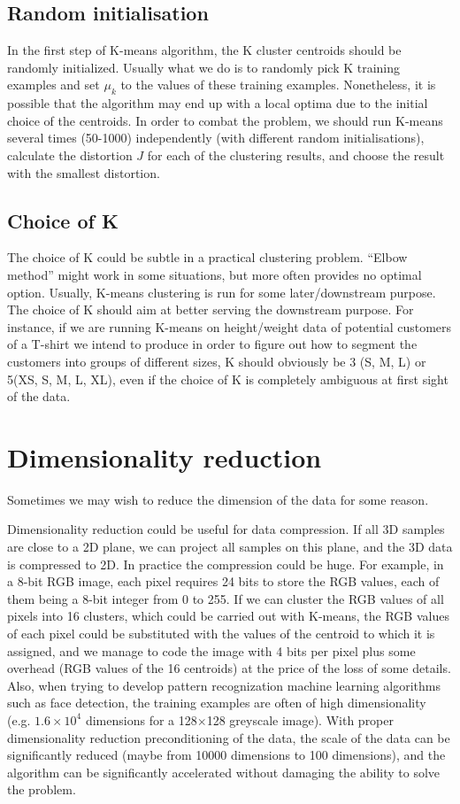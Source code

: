 \subsection{Random initialisation}
In the first step of K-means algorithm, the K cluster centroids should be randomly initialized. Usually what we do is to randomly pick K training examples and set $\mu_k$ to the values of these training examples. Nonetheless, it is possible that the algorithm may end up with a local optima due to the initial choice of the centroids. In order to combat the problem, we should run K-means several times (50-1000) independently (with different random initialisations), calculate the distortion $J$ for each of the clustering results, and choose the result with the smallest distortion.
\subsection{Choice of K}
The choice of K could be subtle in a practical clustering problem. ``Elbow method'' might work in some situations, but more often provides no optimal option. Usually, K-means clustering is run for some later/downstream purpose. The choice of K should aim at better serving the downstream purpose. For instance, if we are running K-means on height/weight data of potential customers of a T-shirt we intend to produce in order to figure out how to segment the customers into groups of different sizes, K should obviously be 3 (S, M, L) or 5(XS, S, M, L, XL), even if the choice of K is completely ambiguous at first sight of the data.
\section{Dimensionality reduction}
Sometimes we may wish to reduce the dimension of the data for some reason. 

Dimensionality reduction could be useful for data compression. If all 3D samples are close to a 2D plane, we can project all samples on this plane, and the 3D data is compressed to 2D. In practice the compression could be huge. For example, in a 8-bit RGB image, each pixel requires 24 bits to store the RGB values, each of them being a 8-bit integer from 0 to 255. If we can cluster the RGB values of all pixels into 16 clusters, which could be carried out with K-means, the RGB values of each pixel could be substituted with the values of the centroid to which it is assigned, and we manage to code the image with 4 bits per pixel plus some overhead (RGB values of the 16 centroids) at the price of the loss of some details. Also, when trying to develop pattern recognization machine learning algorithms such as face detection, the training examples are often of high dimensionality (e.g. $1.6\times10^4$ dimensions for a 128$\times$128 greyscale image). With proper dimensionality reduction preconditioning of the data, the scale of the data can be significantly reduced (maybe from 10000 dimensions to 100 dimensions), and the algorithm can be significantly accelerated without damaging the ability to solve the problem.

